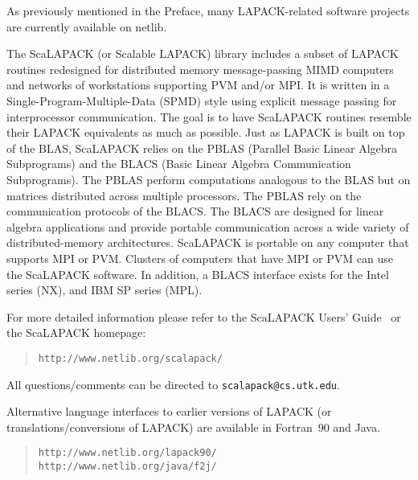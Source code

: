 As previously mentioned in the Preface, many LAPACK-related software
projects are currently available on netlib.

The ScaLAPACK (or Scalable LAPACK) library includes
a subset of LAPACK routines redesigned for distributed memory
message-passing MIMD computers and networks of workstations supporting
PVM and/or MPI.  It is written in a Single-Program-Multiple-Data (SPMD)
style using explicit message passing for interprocessor communication.
The goal is to have ScaLAPACK routines resemble their LAPACK
equivalents as much as possible.  Just as LAPACK
is built on top of the BLAS, ScaLAPACK relies on the PBLAS 
(Parallel Basic Linear Algebra Subprograms) and the
BLACS (Basic Linear Algebra Communication Subprograms).
The PBLAS perform computations analogous to the BLAS but on matrices
distributed across multiple processors.
The PBLAS rely on the communication protocols of the BLACS.
The BLACS are designed for linear
algebra applications and provide portable communication across a wide variety
of distributed-memory architectures.  ScaLAPACK is portable on any
computer that supports MPI or PVM.  Clusters of computers that have MPI
or PVM can use the ScaLAPACK software.  In addition, a BLACS interface exists
for the Intel series (NX), and IBM SP series (MPL).

For more detailed information please refer to the ScaLAPACK Users' Guide~\cite{slug} or the ScaLAPACK homepage:
\begin{quote}
{\tt http://www.netlib.org/scalapack/}
\end{quote}
All questions/comments can be directed to {\tt scalapack@cs.utk.edu}.

Alternative language interfaces to earlier versions of LAPACK (or translations/conversions
of LAPACK) are available in Fortran~90 and Java.
\begin{quote}
{\tt http://www.netlib.org/lapack90/} \\ 
{\tt http://www.netlib.org/java/f2j/} 
\end{quote}
